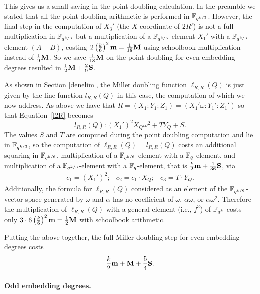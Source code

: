 This gives us a small saving in the point doubling calculation.
In the preamble we stated that all the point doubling arithmetic is performed 
in $\mathbb{F}_{q^{k/3}}$. 
However, the final step in the computation of $X_3'$
(the $X$-coordinate of $2R'$) is not a full multiplication in $\mathbb{F}_{q^{k/3}}$
but a multiplication of a $\mathbb{F}_{q^{k/6}}$-element $X_1'$ with a 
$\mathbb{F}_{q^{k/3}}$-element $(A-B)$,
costing $2\left(\frac{k}{6}\right)^2\textbf{m} = \frac{1}{18}\textbf{M}$
using schoolbook multiplication instead of $\frac{1}{9}\textbf{M}$.
So we save $\frac{1}{18}\textbf{M}$ on the point doubling for even embedding degrees
resulted in
$\frac{1}{2}\textbf{M} + \frac{2}{9}\textbf{S}$.

As shown in Section \ref{denelim}, the Miller doubling function $\ell_{R,R}(Q)$ is just given by the line function $l_{R,R}(Q)$ in this case, the computation of which we now address.
As above we have that $R = (X_1:Y_1:Z_1) = (X_1'\omega:Y_1':Z_1')$ 
so that Equation~\ref{l2R} becomes
\[l_{R,R}(Q): (X_1')^2X_Q\omega^2 + T Y_Q + S.\]
The values $S$ and $T$ are computed during the point doubling computation and lie in $\mathbb{F}_{q^{k/3}}$,
so the computation of $\ell_{R,R}(Q) = l_{R,R}(Q)$ costs an additional squaring in $\mathbb{F}_{q^{k/6}}$, multiplication of a $\mathbb{F}_{q^{k/6}}$-element with a $\mathbb{F}_{q}$-element, and multiplication of a $\mathbb{F}_{q^{k/3}}$-element with a $\mathbb{F}_{q}$-element, that is 
$\frac{k}{2}\textbf{m} + \frac{1}{36}\textbf{S}$, via
\[\begin{array}{ccc}
c_1 = (X_1')^2; & c_2 = c_1 \cdot  X_Q; & c_3 = T \cdot Y_Q.
\end{array}\]
Additionally, the formula for $\ell_{R,R}(Q)$ considered as an element of the $\mathbb{F}_{q^{k/6}}$-vector space generated by $\omega$ and $\alpha$ has no coefficient of $\omega$, $\alpha\omega$, or $\alpha\omega^2$.
Therefore the multiplication of $\ell_{R,R}(Q)$ with a general element 
(i.e., $f^2$) of
$\mathbb{F}_{q^k}$ costs only $3\cdot 6\left(\frac{k}{6}\right)^2\textbf{m}= \frac{1}{2}\textbf{M}$ with schoolbook arithmetic.

Putting the above together, the full Miller doubling step for even embedding degrees costs
$$\frac{k}{2}\textbf{m} + \textbf{M} + \frac{5}{4}\textbf{S}.$$

\paragraph*{Odd embedding degrees.}

